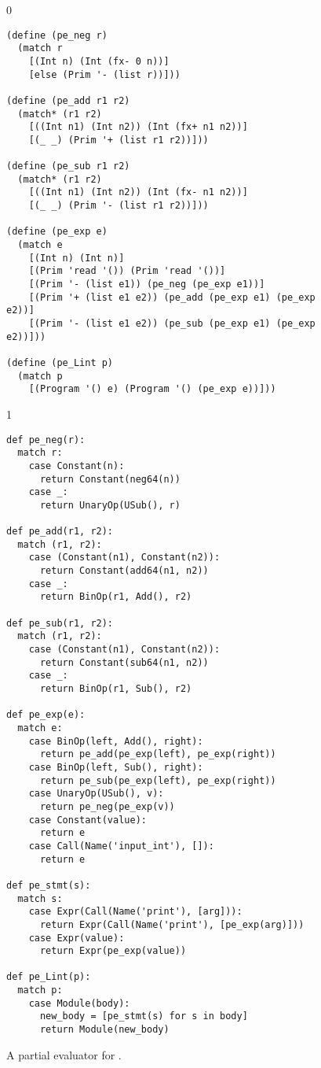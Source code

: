 \documentclass[7x10]{TimesAPriori_MIT}%
\def\racketEd{0}
\def\pythonEd{1}
\def\edition{1}
\newcommand{\pythonColor}[0]{}
\numberwithin{theorem}{chapter}
\numberwithin{definition}{chapter}
\numberwithin{equation}{chapter}
\begin{document}
\begin{figure}[tp]
  \begin{tcolorbox}[colback=white]
    {\if\edition\racketEd
\begin{lstlisting}
(define (pe_neg r)
  (match r
    [(Int n) (Int (fx- 0 n))]
    [else (Prim '- (list r))]))

(define (pe_add r1 r2)
  (match* (r1 r2)
    [((Int n1) (Int n2)) (Int (fx+ n1 n2))]
    [(_ _) (Prim '+ (list r1 r2))]))

(define (pe_sub r1 r2)
  (match* (r1 r2)
    [((Int n1) (Int n2)) (Int (fx- n1 n2))]
    [(_ _) (Prim '- (list r1 r2))]))

(define (pe_exp e)
  (match e
    [(Int n) (Int n)]
    [(Prim 'read '()) (Prim 'read '())]
    [(Prim '- (list e1)) (pe_neg (pe_exp e1))]
    [(Prim '+ (list e1 e2)) (pe_add (pe_exp e1) (pe_exp e2))]
    [(Prim '- (list e1 e2)) (pe_sub (pe_exp e1) (pe_exp e2))]))

(define (pe_Lint p)
  (match p
    [(Program '() e) (Program '() (pe_exp e))]))
\end{lstlisting}
\fi}
{\if\edition\pythonEd\pythonColor
\begin{lstlisting}
def pe_neg(r):
  match r:
    case Constant(n):
      return Constant(neg64(n))
    case _:
      return UnaryOp(USub(), r)
  
def pe_add(r1, r2):
  match (r1, r2):
    case (Constant(n1), Constant(n2)):
      return Constant(add64(n1, n2))
    case _:
      return BinOp(r1, Add(), r2)

def pe_sub(r1, r2):
  match (r1, r2):
    case (Constant(n1), Constant(n2)):
      return Constant(sub64(n1, n2))
    case _:
      return BinOp(r1, Sub(), r2)
      
def pe_exp(e):
  match e:
    case BinOp(left, Add(), right):
      return pe_add(pe_exp(left), pe_exp(right))
    case BinOp(left, Sub(), right):
      return pe_sub(pe_exp(left), pe_exp(right))
    case UnaryOp(USub(), v):
      return pe_neg(pe_exp(v))
    case Constant(value):
      return e
    case Call(Name('input_int'), []):
      return e            

def pe_stmt(s):
  match s:
    case Expr(Call(Name('print'), [arg])):
      return Expr(Call(Name('print'), [pe_exp(arg)]))
    case Expr(value):
      return Expr(pe_exp(value))

def pe_Lint(p):
  match p:
    case Module(body):
      new_body = [pe_stmt(s) for s in body]
      return Module(new_body)
\end{lstlisting}
\fi}
\end{tcolorbox}
\caption{A partial evaluator for \LangInt{}.}
\label{fig:pe-arith}
\end{figure}
\end{document}
